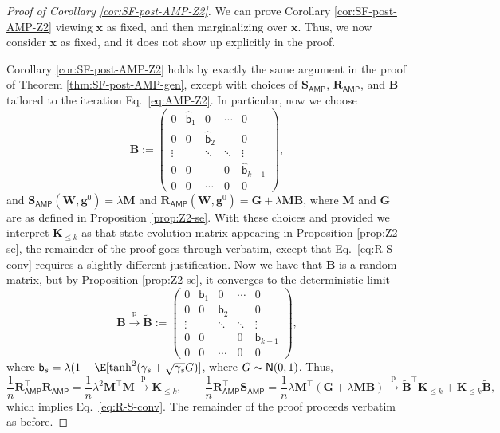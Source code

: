 \documentclass[]{article}
\def\bR{{\boldsymbol R}}
\def\sb{{\mathsf b}}
\def\bx{{\boldsymbol x}}
\def\bW{{\boldsymbol W}}
\def\normal{{\sf N}}
\def\bM{{\boldsymbol M}}
\def\bS{\boldsymbol{S}}
\def\bB{{\boldsymbol B}}
\def\bg{{\boldsymbol g}}
\def\bx{{\boldsymbol x}}
\def\bW{{\boldsymbol W}}
\def\bG{{\boldsymbol G}}
\def\normal{{\sf N}}
\def\bg{{\boldsymbol g}}
\def\bK{\boldsymbol{K}}
\def\pconv{\stackrel{\mathrm{p}}\rightarrow}
\def\AMP{\mathsf{AMP}}
\def\sbhat{\widehat{\mathsf{b}}{}}
\begin{document}
\begin{proof}[Proof of Corollary \ref{cor:SF-post-AMP-Z2}]
    We can prove Corollary \ref{cor:SF-post-AMP-Z2} viewing $\bx$ as fixed, and then marginalizing over $\bx$.
    Thus, we now consider $\bx$ as fixed, and it does not show up explicitly in the proof.

    Corollary \ref{cor:SF-post-AMP-Z2} holds by exactly the same argument in the proof of Theorem \ref{thm:SF-post-AMP-gen},
    except with choices of $\bS_{\AMP}$, $\bR_{\AMP}$, and $\bB$ tailored to the iteration Eq.~\eqref{eq:AMP-Z2}.
    In particular, 
    now we choose 
    \begin{equation}
    \bB
        := 
        \begin{pmatrix}
            0      & \sbhat_1 & 0     & \cdots & 0 \\[5pt]
            0      & 0     & \sbhat_2 & & 0 \\[5pt]
            \vdots &       & \ddots     & \ddots & \vdots \\[5pt]
            0 &  0     &       & 0 & \sbhat_{k-1} \\[5pt]
            0      & 0     &    \cdots   & 0 & 0
        \end{pmatrix},
    \end{equation}
    and $\bS_{\AMP}(\bW,\bg^0) = \lambda \bM$ and $\bR_{\AMP}(\bW,\bg^0) = \bG + \lambda \bM \bB$,
    where $\bM$ and $\bG$ are as defined in Proposition \ref{prop:Z2-se}.
    With these choices and provided we interpret $\bK_{\leq k}$ as that state evolution matrix appearing in Proposition \ref{prop:Z2-se}, 
    the remainder of the proof goes through verbatim, except that Eq.~\eqref{eq:R-S-conv} 
    requires a slightly different justification.
    Now we have that $\bB$ is a random matrix,
    but by Proposition \ref{prop:Z2-se},
    it converges to the deterministic limit
    \begin{equation}
        \bB \pconv \tilde \bB := 
            \begin{pmatrix}
            0      & \sb_1 & 0     & \cdots & 0 \\[5pt]
            0      & 0     & \sb_2 & & 0 \\[5pt]
            \vdots &       & \ddots     & \ddots & \vdots \\[5pt]
            0 &  0     &       & 0 & \sb_{k-1} \\[5pt]
            0      & 0     &    \cdots   & 0 & 0
        \end{pmatrix},
    \end{equation}
    where $\sb_s = \lambda(1 - \E[\tanh^2(\gamma_s + \sqrt{\gamma_s}G)]$, where $G \sim \normal(0,1)$.
    Thus,
    \begin{equation}
        \frac1n \bR_{\AMP}^\top \bR_{\AMP} 
            =
            \frac1n \lambda^2 \bM^\top \bM \pconv \bK_{\leq k},
        \qquad 
        \frac1n \bR_{\AMP}^\top \bS_{\AMP}
            =
            \frac1n \lambda \bM^\top (\bG + \lambda \bM \bB)
            \pconv \tilde \bB^\top \bK_{\leq k} + \bK_{\leq k} \tilde \bB,
    \end{equation}
    which implies Eq.~\eqref{eq:R-S-conv}. 
    The remainder of the proof proceeds verbatim as before.
\end{proof}
\end{document}
